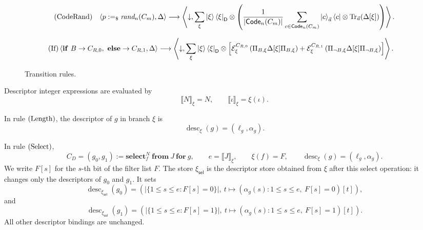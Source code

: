 \documentclass[acmsmall,screen,review,anonymous,nonacm]{acmart}
\theoremstyle{defn_style}
\begin{document}
\begin{figure}[H]
\[
\begin{array}{ll}
\text{\rm (CodeRand)}
&
\displaystyle
\left\langle
p:=_{\$}\textit{rand}_{n}(C_m),\Delta
\right\rangle
\longrightarrow
\left\langle
\downarrow,
\sum_{\xi}
\ket{\xi}\bra{\xi}_{\mathsf D}
\otimes
\left(
\frac{1}{|\mathsf{Code}_n(C_m)|}
\sum_{c\in\mathsf{Code}_n(C_m)}
\ket c_{\vec a}\bra c
\otimes
\operatorname{Tr}_{\vec a}(\Delta[\xi])
\right)
\right\rangle .
\end{array}
\]

\[
\begin{aligned}
&
\text{\rm (If)}
\left\langle
\mathbf{if}\ B\rightarrow C_{R,0},\ \mathbf{else}\rightarrow C_{R,1},
\Delta
\right\rangle
\longrightarrow
\left\langle
\downarrow,
\sum_{\xi}
\ket{\xi}\bra{\xi}_{\mathsf D}
\otimes
\left[
\mathcal E^{C_{R,0}}_{\xi}
\left(
\Pi_{B,\xi}\Delta[\xi]\Pi_{B,\xi}
\right)
+
\mathcal E^{C_{R,1}}_{\xi}
\left(
\Pi_{\neg B,\xi}\Delta[\xi]\Pi_{\neg B,\xi}
\right)
\right]
\right\rangle .
\end{aligned}
\]

\caption{Transition rules.}
\label{fig:operational-semantics}
\end{figure}

Descriptor integer expressions are evaluated by
\[
\llbracket N\rrbracket_{\xi}=N,
\qquad
\llbracket \iota\rrbracket_{\xi}=\xi(\iota).
\]

In rule \({\rm (Length)}\), the descriptor of \(g\) in branch \(\xi\) is
\[
\operatorname{desc}_{\xi}(g)=(\ell_g,\alpha_g).
\]

In rule \({\rm (Select)}\),
\[
C_D=
(g_0,g_1):=
\mathbf{select}_{f}^{N}\ \mathbf{from}\ J\ \mathbf{for}\ g,
\qquad
e=\llbracket J\rrbracket_{\xi},
\qquad
\xi(f)=F,
\qquad
\operatorname{desc}_{\xi}(g)=(\ell_g,\alpha_g).
\]
We write \(F[s]\) for the \(s\)-th bit of the filter list \(F\).
The store \(\xi_{\mathsf{sel}}\) is the descriptor store obtained from \(\xi\)
after this select operation: it changes only the descriptors of \(g_0\) and
\(g_1\). It sets
\[
\operatorname{desc}_{\xi_{\mathsf{sel}}}(g_0)
=
\left(
|\{1\le s\le e:F[s]=0\}|,
\ t\mapsto (\alpha_g(s):1\le s\le e,\ F[s]=0)[t]
\right),
\]
and
\[
\operatorname{desc}_{\xi_{\mathsf{sel}}}(g_1)
=
\left(
|\{1\le s\le e:F[s]=1\}|,
\ t\mapsto (\alpha_g(s):1\le s\le e,\ F[s]=1)[t]
\right).
\]
All other descriptor bindings are unchanged.
\end{document}

